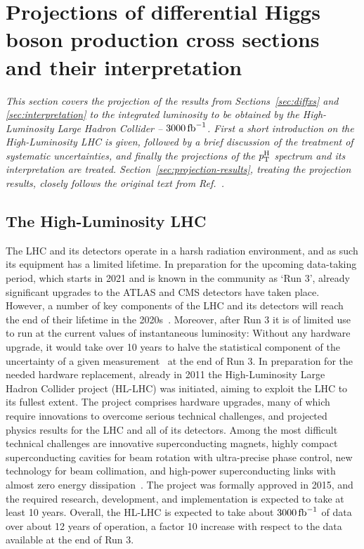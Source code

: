 \section{Projections of differential Higgs boson production cross sections and their interpretation}

\emph{%
This section covers the projection of the results from Sections~\ref{sec:diffxs} and \ref{sec:interpretation} to the integrated luminosity to be obtained by the High-Luminosity Large Hadron Collider -- $3000\,\text{fb}^{-1}$.
% 
First a short introduction on the High-Luminosity LHC is given, followed by a brief discussion of the treatment of systematic uncertainties, and finally the projections of the $p_\mathrm{T}^\mathrm{H}$ spectrum and its interpretation are treated.
% 
Section~\ref{sec:projection-results}, treating the projection results, closely follows the original text from Ref.~\cite{CMS:2018qgz}.
}


\subsection{The High-Luminosity LHC}

The LHC and its detectors operate in a harsh radiation environment, and as such its equipment has a limited lifetime.
% 
In preparation for the upcoming data-taking period, which starts in 2021 and is known in the community as `Run 3', already significant upgrades to the ATLAS and CMS detectors have taken place.
% 
However, a number of key components of the LHC and its detectors will reach the end of their lifetime in the 2020s~\cite{hllhc}.
% 
Moreover, after Run 3 it is of limited use to run at the current values of instantaneous luminosity: Without any hardware upgrade, it would take over 10 years to halve the statistical component of the uncertainty of a given measurement~\cite{hllhc} at the end of Run 3.
% 
In preparation for the needed hardware replacement, already in 2011 the High-Luminosity Large Hadron Collider project (HL-LHC) was initiated, aiming to exploit the LHC to its fullest extent.
% 
The project comprises hardware upgrades, many of which require innovations to overcome serious technical challenges, and projected physics results for the LHC and all of its detectors.
% 
Among the most difficult technical challenges are innovative superconducting magnets, highly compact superconducting cavities for beam rotation with ultra-precise phase control, new technology for beam collimation, and high-power superconducting links with almost zero energy dissipation~\cite{hllhc}.
% 
The project was formally approved in 2015, and the required research, development, and implementation is expected to take at least 10 years.
% 
Overall, the HL-LHC is expected to take about $3000\,\text{fb}^{-1}$ of data over about 12 years of operation, a factor 10 increase with respect to the data available at the end of Run 3.



